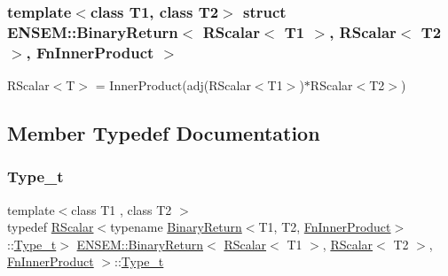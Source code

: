 \subsubsection*{template$<$class T1, class T2$>$\newline
struct E\+N\+S\+E\+M\+::\+Binary\+Return$<$ R\+Scalar$<$ T1 $>$, R\+Scalar$<$ T2 $>$, Fn\+Inner\+Product $>$}

R\+Scalar$<$\+T$>$ = Inner\+Product(adj(\+R\+Scalar$<$\+T1$>$)$\ast$\+R\+Scalar$<$\+T2$>$) 

\subsection{Member Typedef Documentation}
\mbox{\label{structENSEM_1_1BinaryReturn_3_01RScalar_3_01T1_01_4_00_01RScalar_3_01T2_01_4_00_01FnInnerProduct_01_4_ab67f263abb333e0fd405c675a12d635e}} 
\subsubsection{\texorpdfstring{Type\_t}{Type\_t}\hspace{0.1cm}{\footnotesize\ttfamily [1/2]}}
{\footnotesize\ttfamily template$<$class T1 , class T2 $>$ \\
typedef \mbox{\hyperlink{classENSEM_1_1RScalar}{R\+Scalar}}$<$typename \mbox{\hyperlink{structENSEM_1_1BinaryReturn}{Binary\+Return}}$<$T1, T2, \mbox{\hyperlink{structENSEM_1_1FnInnerProduct}{Fn\+Inner\+Product}}$>$\+::\mbox{\hyperlink{structENSEM_1_1BinaryReturn_3_01RScalar_3_01T1_01_4_00_01RScalar_3_01T2_01_4_00_01FnInnerProduct_01_4_ab67f263abb333e0fd405c675a12d635e}{Type\+\_\+t}}$>$ \mbox{\hyperlink{structENSEM_1_1BinaryReturn}{E\+N\+S\+E\+M\+::\+Binary\+Return}}$<$ \mbox{\hyperlink{classENSEM_1_1RScalar}{R\+Scalar}}$<$ T1 $>$, \mbox{\hyperlink{classENSEM_1_1RScalar}{R\+Scalar}}$<$ T2 $>$, \mbox{\hyperlink{structENSEM_1_1FnInnerProduct}{Fn\+Inner\+Product}} $>$\+::\mbox{\hyperlink{structENSEM_1_1BinaryReturn_3_01RScalar_3_01T1_01_4_00_01RScalar_3_01T2_01_4_00_01FnInnerProduct_01_4_ab67f263abb333e0fd405c675a12d635e}{Type\+\_\+t}}}

